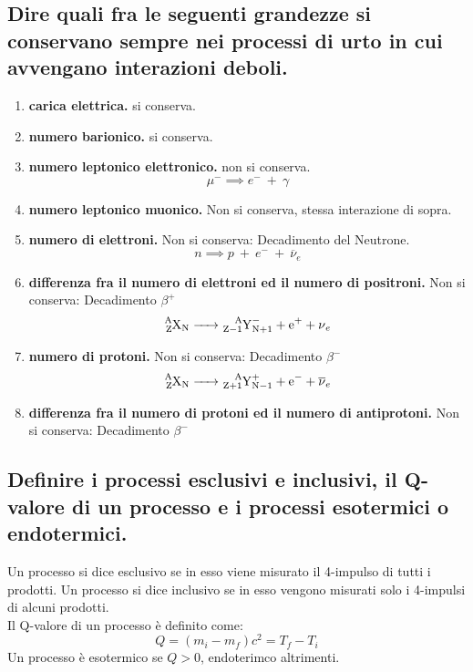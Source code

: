 \subsection[]{ Dire quali fra le seguenti grandezze si conservano sempre nei processi di urto in cui avvengano interazioni deboli.}
\begin{enumerate}
	\item \textbf{carica elettrica.} si conserva.
	\item \textbf{numero barionico.} si conserva.
	\item \textbf{numero leptonico elettronico.} non si conserva.
	\[
		\mu^- \implies e^- \ + \ \gamma
	\]
	\item \textbf{numero leptonico muonico.} Non si conserva, stessa interazione di sopra.
	\item \textbf{numero di elettroni.} Non si conserva: Decadimento del Neutrone.
	\[
		n \implies p \ + \ e^- \ + \ \overline{\nu}_{e}
	\] 
	\item \textbf{differenza fra il numero di elettroni ed il numero di positroni.} Non si conserva: Decadimento $\beta^+$
	\[	
		\ce{\ce{^{A}_{Z}X_{N}} -> \ce{^{A}_{Z-1}Y^{-}_{N+1}} + e^{+} + \nu_{e} }
	\] 
	\item \textbf{numero di protoni.} Non si conserva: Decadimento $\beta^-$
	\[
		\ce{\ce{^{A}_{Z}X_{N}} -> \ce{^{A}_{Z+1}Y^{+}_{N-1}} + e^{-} + \overline{\nu}_{e} }
	\] 
	\item \textbf{differenza fra il numero di protoni ed il numero di antiprotoni.} Non si conserva: Decadimento $\beta^-$ 
\end{enumerate}

\subsection[]{ Definire i processi esclusivi e inclusivi, il Q-valore di un processo e i processi esotermici o endotermici.}
Un processo si dice esclusivo se in esso viene misurato il 4-impulso di tutti i prodotti. Un processo si dice inclusivo se in esso vengono misurati solo i 4-impulsi di alcuni prodotti.\\
Il Q-valore di un processo è definito come: 
\[
	Q = \left( m_{i} - m_{f} \right) c^2 = T_f - T_i
\] \label{eq:Q-valore}
Un processo è esotermico se $Q > 0$, endoterimco altrimenti.

